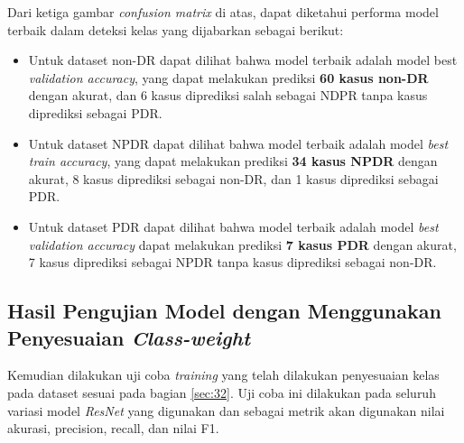 Dari ketiga gambar \emph{confusion matrix} di atas, dapat diketahui performa model terbaik dalam deteksi kelas yang dijabarkan sebagai berikut:

\begin{itemize}
	\item Untuk dataset non-DR dapat dilihat bahwa model terbaik adalah model best \emph{validation accuracy}, yang dapat melakukan prediksi \textbf{60 kasus non-DR} dengan akurat, dan 6 kasus diprediksi salah sebagai NDPR tanpa kasus diprediksi sebagai PDR.
	
	\item Untuk dataset NPDR dapat dilihat bahwa model terbaik adalah model \emph{best train accuracy}, yang dapat melakukan prediksi \textbf{34 kasus NPDR} dengan akurat, 8 kasus diprediksi sebagai non-DR, dan 1 kasus diprediksi sebagai PDR.
	
	\item Untuk dataset PDR dapat dilihat bahwa model terbaik adalah model \emph{best validation accuracy} dapat melakukan prediksi \textbf{7 kasus PDR} dengan akurat, 7 kasus diprediksi sebagai NPDR tanpa kasus diprediksi sebagai non-DR.
\end{itemize}
\pagebreak

\subsection{Hasil Pengujian Model dengan Menggunakan Penyesuaian \emph{Class-weight}}
\label{sec:412}
Kemudian dilakukan uji coba \emph{training} yang telah dilakukan penyesuaian kelas pada dataset sesuai pada bagian \ref{sec:32}. Uji coba ini dilakukan pada seluruh variasi model \emph{ResNet} yang digunakan dan sebagai metrik akan digunakan nilai akurasi, precision, recall, dan nilai F1.

